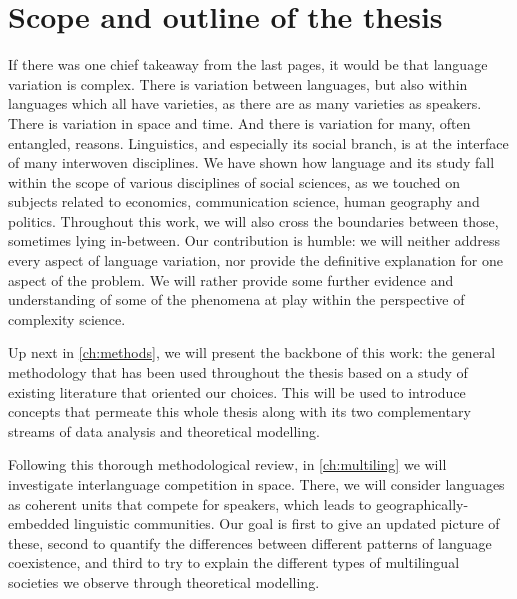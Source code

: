 \documentclass[../thesis.tex]{subfiles}
\begin{document}


\section{Scope and outline of the thesis}
If there was one chief takeaway from the last pages, it would be that language variation
is complex. There is variation between languages, but also within languages which all
have varieties, as there are as many varieties as speakers. There is variation in space
and time. And there is variation for many, often entangled, reasons. Linguistics, and
especially its social branch, is at the interface of many interwoven
disciplines. We have shown how language and its study fall within the scope of various
disciplines of social sciences, as we touched on subjects related to economics,
communication science, human geography and politics. Throughout this work, we will also
cross the boundaries between those, sometimes lying in-between. Our contribution is
humble: we will neither address every aspect of language variation,
nor provide the definitive explanation for one aspect of the problem. We will rather
provide some further evidence and understanding of some of the phenomena at play within the perspective of complexity science.

Up next in \cref{ch:methods}, we will present the backbone of this work: the general
methodology that has been used throughout the thesis based on a study of existing literature
that oriented our choices. This will be used to introduce concepts that permeate this
whole thesis along with its two complementary streams of data analysis and theoretical
modelling.

Following this thorough methodological review, in \cref{ch:multiling} we will investigate
interlanguage competition in space. There, we will consider languages as coherent units
that compete for speakers, which leads to geographically-embedded linguistic
communities. Our goal is first to give an updated picture of these, second to quantify the differences
between different patterns of language coexistence, and third to try to explain the different types of multilingual societies we observe through theoretical modelling.
\end{document}
